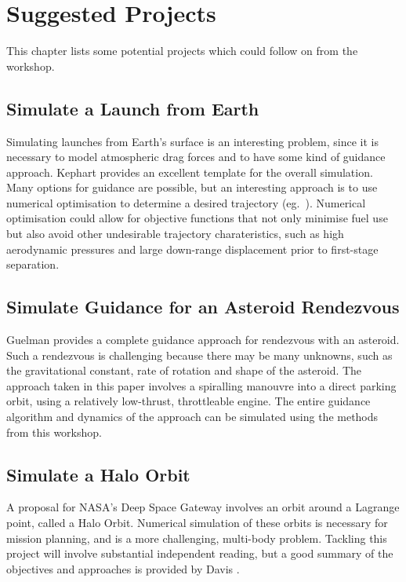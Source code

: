 \documentclass[12pt,openany]{book}
\begin{document}
\chapter{Suggested Projects}

This chapter lists some potential projects which could follow on from the workshop.

\section{Simulate a Launch from Earth}

Simulating launches from Earth's surface is an interesting problem, since it is necessary to model atmospheric drag forces and to have some kind of guidance approach. Kephart \cite{kephart1971} provides an excellent template for the overall simulation. Many options for guidance are possible, but an interesting approach is to use numerical optimisation to determine a desired trajectory (eg.\ \cite{dileep2015,dukeman2008}). Numerical optimisation could allow for objective functions that not only minimise fuel use but also avoid other undesirable trajectory charateristics, such as high aerodynamic pressures and large down-range displacement prior to first-stage separation.

\section{Simulate Guidance for an Asteroid Rendezvous}

Guelman \cite{guelman1991} provides a complete guidance approach for rendezvous with an asteroid. Such a rendezvous is challenging because there may be many unknowns, such as the gravitational constant, rate of rotation and shape of the asteroid. The approach taken in this paper involves a spiralling manouvre into a direct parking orbit, using a relatively low-thrust, throttleable engine. The entire guidance algorithm and dynamics of the approach can be simulated using the methods from this workshop.

\section{Simulate a Halo Orbit}

A proposal for NASA's Deep Space Gateway involves an orbit around a Lagrange point, called a Halo Orbit. Numerical simulation of these orbits is necessary for mission planning, and is a more challenging, multi-body problem. Tackling this project will involve substantial independent reading, but a good summary of the objectives and approaches is provided by Davis \cite{davis2017}.
\end{document}

